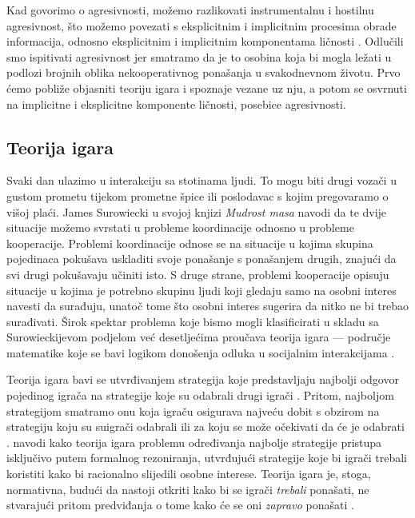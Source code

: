 \documentclass[a4paper, 12pt]{report}
\begin{document}
Kad govorimo o agresivnosti, možemo razlikovati instrumentalnu i hostilnu agresivnost, što
možemo povezati s eksplicitnim i implicitnim procesima obrade informacija, 
odnosno eksplicitnim i implicitnim komponentama ličnosti \citep{richetin2008automatic}.
Odlučili smo ispitivati agresivnost jer smatramo da je to osobina koja bi mogla
ležati u podlozi brojnih oblika nekooperativnog ponašanja u svakodnevnom životu.
Prvo ćemo pobliže objasniti teoriju igara i spoznaje vezane uz nju, a potom se
osvrnuti na implicitne i eksplicitne komponente ličnosti, posebice agresivnosti.

\subsection{Teorija igara}

Svaki dan ulazimo u interakciju sa stotinama ljudi. To mogu biti drugi vozači u
gustom prometu tijekom prometne špice ili poslodavac s kojim pregovaramo o
višoj plaći. James Surowiecki \citeyearpar{wisdcrowd} u svojoj knjizi
\emph{Mudrost masa} navodi da te dvije situacije možemo svrstati u probleme
koordinacije odnosno u probleme kooperacije. 
Problemi koordinacije odnose se na situacije u kojima skupina pojedinaca
pokušava uskladiti svoje ponašanje s ponašanjem drugih, znajući da svi drugi
pokušavaju učiniti isto. S druge strane, problemi kooperacije
opisuju situacije u kojima je potrebno skupinu ljudi koji gledaju samo na 
osobni interes navesti da surađuju, unatoč tome što osobni interes sugerira da
nitko ne bi trebao surađivati. 
Širok spektar problema koje bismo mogli klasificirati u skladu sa
Surowieckijevom \citeyearpar{wisdcrowd} podjelom već desetljećima proučava
teorija igara --- područje matematike koje se bavi logikom donošenja odluka u
socijalnim interakcijama \citep{colgt}. 

Teorija igara bavi se utvrđivanjem strategija koje 
predstavljaju najbolji odgovor 
pojedinog igrača  na strategije koje su odabrali drugi igrači 
\citep{mccain2010g, colgt}. Pritom, najboljom strategijom smatramo onu 
koja igraču osigurava najveću dobit s obzirom na strategiju koju su suigrači odabrali
ili za koju se može očekivati da će je odabrati \citep{mccain2010g}. 
\citet{colgt} navodi kako teorija igara problemu određivanja najbolje
strategije pristupa isključivo putem formalnog rezoniranja, utvrđujući 
 strategije koje bi igrači trebali koristiti kako bi racionalno slijedili osobne interese.
Teorija igara je, stoga, normativna, budući da nastoji otkriti kako bi se igrači
\emph{trebali} ponašati, ne stvarajući pritom predviđanja o tome kako će se oni
\emph{zapravo} ponašati \citep{colgt}. 
\end{document}
